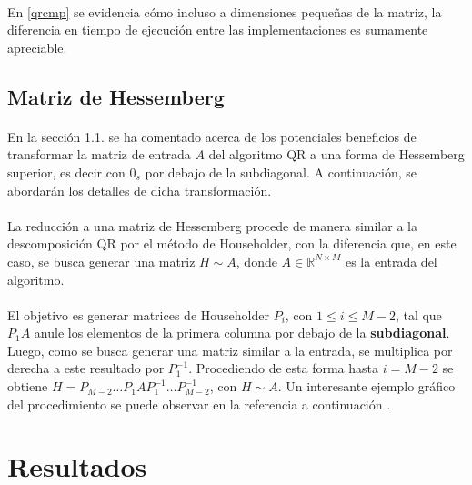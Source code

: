 \documentclass[12pt, twocolumn]{article}
\begin{document}
	\paragraph{} En \ref{qrcmp} se evidencia cómo incluso a dimensiones pequeñas de la matriz, la diferencia en tiempo de ejecución entre las implementaciones es sumamente apreciable.
	
	\subsection{Matriz de Hessemberg}
	
	\paragraph{} En la sección 1.1. se ha comentado acerca de los potenciales beneficios de transformar la matriz de entrada $A$ del algoritmo QR a una forma de Hessemberg superior, es decir con $0_{s}$ por debajo de la subdiagonal. A continuación, se abordarán los detalles de dicha transformación.
	
	\paragraph{} La reducción a una matriz de Hessemberg procede de manera similar a la descomposición QR por el método de Householder, con la diferencia que, en este caso, se busca generar una matriz $H \sim A$, donde $A \in \mathbb{R}^{N\times M}$ es la entrada del algoritmo. 
	
	\paragraph{} El objetivo es generar matrices de Householder $P_{i}$, con $ 1\le i \le M-2$, tal que $P_{1}A$ anule los elementos de la primera columna por debajo de la \textbf{subdiagonal}. Luego, como se busca generar una matriz similar a la entrada, se multiplica por derecha a este resultado por $P_{1}^{-1}$. Procediendo de esta forma hasta $i = M-2$ se obtiene $H = P_{M-2}\dots P_{1}AP_{1}^{-1}\dots P_{M-2}^{-1}$, con $H \sim A$. Un interesante ejemplo gráfico del procedimiento se puede observar en la referencia a continuación \cite{hess}. 
	

	
	\section{Resultados}
	
\end{document}
